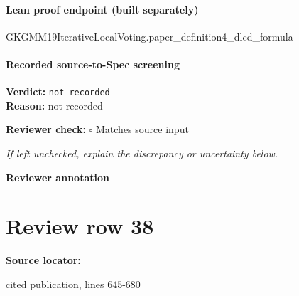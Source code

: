 \documentclass[10pt]{article}
\newcommand{\reviewerbox}{%
  \par\noindent\fbox{\parbox{0.96\linewidth}{\rule{0pt}{0.38in}}}\par
}
\newcommand{\reviewmatch}[1]{%
  \par\noindent\textbf{Reviewer check:} $\square$\; #1\par
  \noindent\emph{If left unchecked, explain the discrepancy or uncertainty below.}\par
}
\begin{document}
\paragraph{Lean proof endpoint (built separately)}\begin{ReviewVerbatim}
GKGMM19IterativeLocalVoting.paper_definition4_dlcd_formula
\end{ReviewVerbatim}

\paragraph{Recorded source-to-Spec screening}
\textbf{Verdict:} \texttt{not recorded}
\\
\textbf{Reason:} not recorded
\reviewmatch{Matches source input}
\noindent\textbf{Reviewer annotation}\par
\reviewerbox
\clearpage
\hypertarget{source-claim-9b6fb18f85b1c2c8}{}
\section*{Review row 38}
\textbf{Source locator:} {\footnotesize\raggedright cited publication, lines 645-\allowbreak{}680\par}
\end{document}
